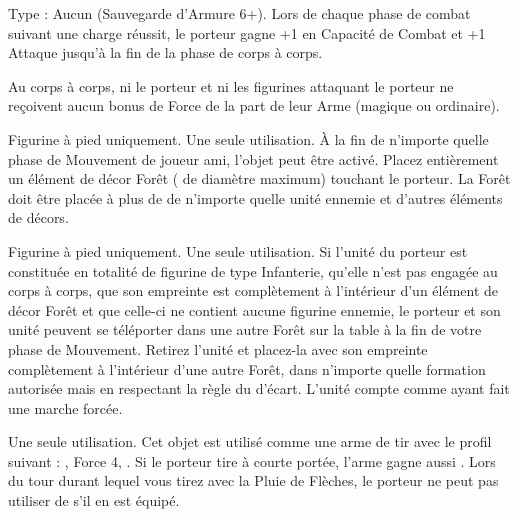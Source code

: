 \endpricelist

\armymagicalarmour

\startpricelist

Type : Aucun (Sauvegarde d'Armure 6+). Lors de chaque phase de combat suivant une charge réussit, le porteur gagne +1 en Capacité de Combat et +1 Attaque jusqu'à la fin de la phase de corps à corps.

\endpricelist

\armytalismans

\startpricelist

Au corps à corps, ni le porteur et ni les figurines attaquant le porteur ne reçoivent aucun bonus de Force de la part de leur Arme (magique ou ordinaire).

\endpricelist

\armyenchanteditems

\startpricelist

Figurine à pied uniquement. Une seule utilisation. À la fin de n'importe quelle phase de Mouvement de joueur ami, l'objet peut être activé. Placez entièrement un élément de décor Forêt ( de diamètre maximum) touchant le porteur. La Forêt doit être placée à plus de  de n'importe quelle unité ennemie et d'autres éléments de décors.

Figurine à pied uniquement. Une seule utilisation. Si l'unité du porteur est constituée en totalité de figurine de type Infanterie, qu'elle n'est pas engagée au corps à corps, que son empreinte est complètement à l'intérieur d'un élément de décor Forêt et que celle-ci ne contient aucune figurine ennemie, le porteur et son unité peuvent se téléporter dans une autre Forêt sur la table à la fin de votre phase de Mouvement. Retirez l'unité et placez-la avec son empreinte complètement à l'intérieur d'une autre Forêt, dans n'importe quelle formation autorisée mais en respectant la règle du  d'écart. L'unité compte comme ayant fait une marche forcée.

Une seule utilisation. Cet objet est utilisé comme une arme de tir avec le profil suivant : , Force 4, . Si le porteur tire à courte portée, l'arme gagne aussi . Lors du tour durant lequel vous tirez avec la Pluie de Flèches, le porteur ne peut pas utiliser de \feyarrows{} s'il en est équipé.

